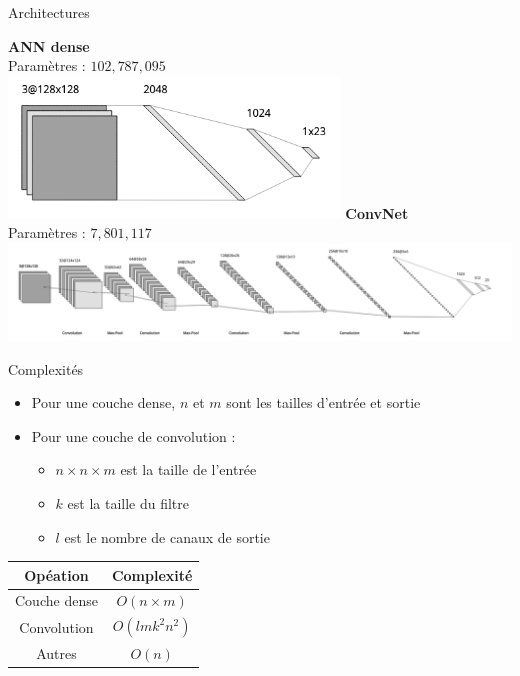 \documentclass[10pt,xcolor={x11names}]{beamer}
\newcommand{\sectitle}[1]{{\large\color{titleblue}\textbf{#1}\\\smallskip}}
\begin{document}
\begin{frame}{Architectures}
	\begin{center}
		\sectitle{ANN dense}
		Paramètres : $102,787,095$\\
		\includegraphics[width=0.66\textwidth]{dense_arch.png}
		\smallskip
		\newline
		\sectitle{ConvNet}
		Paramètres : $7,801,117$\\
		\includegraphics[width=1.1\textwidth]{conv2_arch.png}
	\end{center}
\end{frame}

\begin{frame}{Complexités}
	\begin{itemize}
		\item Pour une couche dense, $n$ et $m$ sont les tailles d'entrée et sortie
		\item Pour une couche de convolution :
		\begin{itemize}
			\item $n\times n\times m$ est la taille de l'entrée
			\item $k$ est la taille du filtre
			\item $l$ est le nombre de canaux de sortie
		\end{itemize}
	\end{itemize}
	\begin{center}
	\begin{tabular}{|c|c|}
		\hline
		\textbf{Opéation} & \textbf{Complexité} \\
		\hline
		Couche dense & $O(n\times m)$ \\
		\hline
		Convolution & $O(lmk^2n^2)$\\
		\hline
		Autres & $O(n)$\\
		\hline
	\end{tabular}
	\end{center}
\end{frame}
\end{document}
